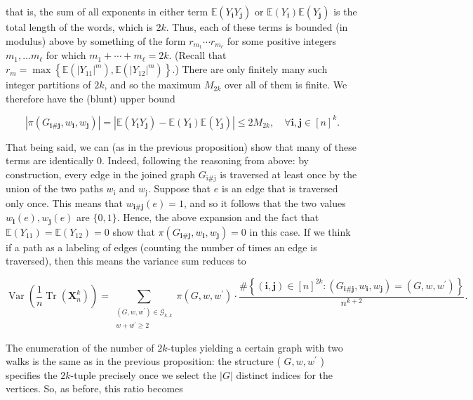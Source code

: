 \documentclass[10pt]{article}
\begin{document}
that is, the sum of all exponents in either term $\mathbb{E}\left(Y_{\mathbf{i}} Y_{\mathbf{j}}\right)$ or $\mathbb{E}\left(Y_{\mathbf{i}}\right) \mathbb{E}\left(Y_{\mathbf{j}}\right)$ is the total length of the words, which is $2 k$. Thus, each of these terms is bounded (in modulus) above by something of the form $r_{m_{1}} \cdots r_{m_{\ell}}$ for some positive integers $m_{1}, \ldots m_{\ell}$ for which $m_{1}+\cdots+m_{\ell}=2 k$. (Recall that\\
$r_{m}=\max \left\{\mathbb{E}\left(\left|Y_{11}\right|^{m}\right), \mathbb{E}\left(\left|Y_{12}\right|^{m}\right)\right\}$.) There are only finitely many such integer partitions of $2 k$, and so the maximum $M_{2 k}$ over all of them is finite. We therefore have the (blunt) upper bound

$$
\left|\pi\left(G_{\mathbf{i} \# \mathbf{j}}, w_{\mathbf{i}}, w_{\mathbf{j}}\right)\right|=\left|\mathbb{E}\left(Y_{\mathbf{i}} Y_{\mathbf{j}}\right)-\mathbb{E}\left(Y_{\mathbf{i}}\right) \mathbb{E}\left(Y_{\mathbf{j}}\right)\right| \leq 2 M_{2 k}, \quad \forall \mathbf{i}, \mathbf{j} \in[n]^{k} .
$$

That being said, we can (as in the previous proposition) show that many of these terms are identically 0. Indeed, following the reasoning from above: by construction, every edge in the joined graph $G_{\mathrm{i} \# \mathrm{j}}$ is traversed at least once by the union of the two paths $w_{\mathrm{i}}$ and $w_{\mathrm{j}}$. Suppose that $e$ is an edge that is traversed only once. This means that $w_{\mathbf{i} \# \mathbf{j}}(e)=1$, and so it follows that the two values $w_{\mathbf{i}}(e), w_{\mathbf{j}}(e)$ are $\{0,1\}$. Hence, the above expansion and the fact that $\mathbb{E}\left(Y_{11}\right)=\mathbb{E}\left(Y_{12}\right)=0$ show that $\pi\left(G_{\mathbf{i} \# \mathbf{j}}, w_{\mathbf{i}}, w_{\mathbf{j}}\right)=0$ in this case. If we think if a path as a labeling of edges (counting the number of times an edge is traversed), then this means the variance sum reduces to

$$
\operatorname{Var}\left(\frac{1}{n} \operatorname{Tr}\left(\mathbf{X}_{n}^{k}\right)\right)=\sum_{\substack{\left(G, w, w^{\prime}\right) \in \mathcal{G}_{k, k} \\ w+w^{\prime} \geq 2}} \pi\left(G, w, w^{\prime}\right) \cdot \frac{\#\left\{(\mathbf{i}, \mathbf{j}) \in[n]^{2 k}:\left(G_{\mathbf{i} \# \mathbf{j}}, w_{\mathbf{i}}, w_{\mathbf{j}}\right)=\left(G, w, w^{\prime}\right)\right\}}{n^{k+2}} .
$$

The enumeration of the number of $2 k$-tuples yielding a certain graph with two walks is the same as in the previous proposition: the structure ( $G, w, w^{\prime}$ ) specifies the $2 k$-tuple precisely once we select the $|G|$ distinct indices for the vertices. So, as before, this ratio becomes
\end{document}
